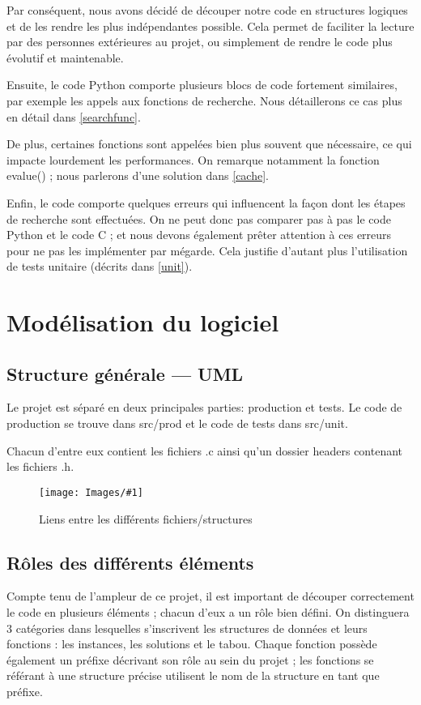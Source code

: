 \documentclass[hideweeklyreports]{polytech/polytech}
\newcommand{\img}[3]{%
	\begin{figure}[H]
		\centering
   		\texttt{[image: Images/\#1]}
  	 	\caption{#2}
	\end{figure}
}
\begin{document}
			Par conséquent, nous avons décidé de découper notre code en structures logiques et de les rendre les plus indépendantes possible. Cela permet de faciliter la lecture par des personnes extérieures au projet, ou simplement de rendre le code plus évolutif et maintenable.
			
			Ensuite, le code Python comporte plusieurs blocs de code fortement similaires, par exemple les appels aux fonctions de recherche. Nous détaillerons ce cas plus en détail dans \autoref{searchfunc}.
			
			De plus, certaines fonctions sont appelées bien plus souvent que nécessaire, ce qui impacte lourdement les performances. On remarque notamment la fonction evalue() ; nous parlerons d'une solution dans \autoref{cache}.
			
			Enfin, le code comporte quelques erreurs qui influencent la façon dont les étapes de recherche sont effectuées. On ne peut donc pas comparer pas à pas le code Python et le code C ; et nous devons également prêter attention à ces erreurs pour ne pas les implémenter par mégarde. Cela justifie d'autant plus l'utilisation de tests unitaire (décrits dans \autoref{unit}).
			
		
	\chapter{Modélisation du logiciel}
		\section{Structure générale — UML}
			Le projet est séparé en deux principales parties: production et tests.
			Le code de production se trouve dans src/prod et le code de tests dans src/unit.
			
			Chacun d'entre eux contient les fichiers .c ainsi qu'un dossier headers contenant les fichiers .h.
			
			\img{UML.png}{Liens entre les différents fichiers/structures}{0.45}

		\section{Rôles des différents éléments}
			Compte tenu de l'ampleur de ce projet, il est important de découper correctement le code en plusieurs éléments ; chacun d'eux a un rôle bien défini. On distinguera 3 catégories dans lesquelles s'inscrivent les structures de données et leurs fonctions : les instances, les solutions et le tabou. Chaque fonction possède également un préfixe décrivant
son rôle au sein du projet ; les fonctions se référant à une structure précise utilisent le nom de la structure en tant que préfixe.			
\end{document}
